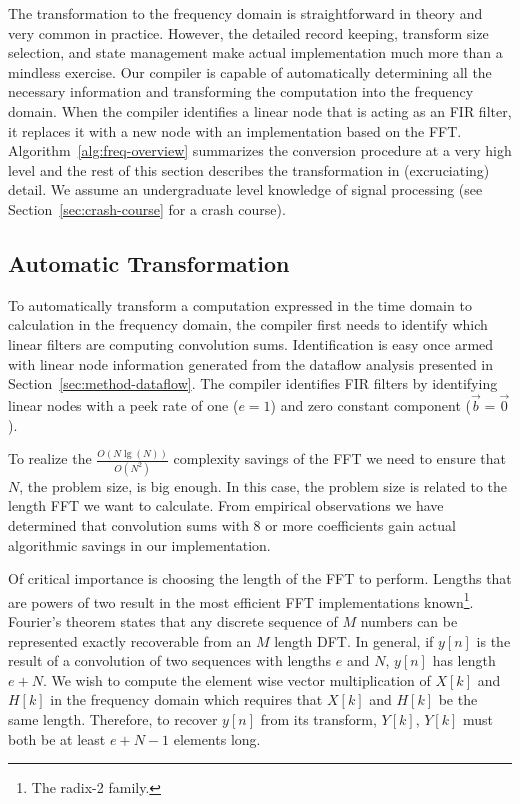 The transformation to the frequency domain is straightforward in theory and 
very common in practice. However, the detailed record keeping, transform size selection,
and state management make actual implementation much more than a mindless
exercise. Our compiler is capable of automatically determining all the necessary
information and transforming the computation into the frequency domain. 
When the compiler identifies a linear node that is acting as an FIR filter, 
it replaces it with a new node with an implementation based on the FFT.
Algorithm~\ref{alg:freq-overview} summarizes the conversion procedure
at a very high level and the rest of this section describes the transformation in 
(excruciating) detail. We assume an undergraduate level knowledge
of signal processing (see Section~\ref{sec:crash-course} for a crash course).

\subsection{Automatic Transformation}
\label{sec:method-opt-freq-details}

To automatically transform a computation expressed in the time domain 
to calculation in the frequency domain, the compiler first needs to identify 
which linear filters are computing convolution sums. Identification is 
easy once armed with linear node information generated from the dataflow 
analysis presented in Section~\ref{sec:method-dataflow}. The compiler 
identifies FIR filters by identifying linear nodes with a peek rate of 
one ($e=1$) and zero constant component (${\vec b} = {\vec 0}$).

To realize the $\frac{O(N\lg(N))}{O(N^2)}$ complexity savings of the FFT
we need to ensure that $N$, the problem size, is big enough. In this case,
the problem size is related to the length FFT we want to calculate.
From empirical observations we have determined that convolution sums with 
$8$ or more coefficients gain actual algorithmic savings in our implementation.

Of critical importance is choosing the length of the FFT to perform. 
Lengths that are powers of two result in the most efficient FFT implementations
known\footnote{The radix-2 family.}. Fourier's theorem states that any 
discrete sequence of $M$ numbers can be represented exactly recoverable from 
an $M$ length DFT. In general, if $y[n]$ is the result of a convolution of 
two sequences with lengths $e$ and $N$, $y[n]$ has length $e+N$.
We wish to compute the element wise vector multiplication of
$X[k]$ and $H[k]$ in the frequency domain which requires that $X[k]$ and $H[k]$ 
be the same length. Therefore, to recover $y[n]$ from its transform, $Y[k]$, 
$Y[k]$ must both be at least $e+N-1$ elements long.

